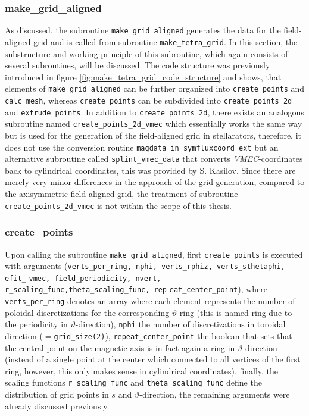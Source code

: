 \documentclass[./main.tex]{subfiles}
\begin{document}
\subsubsection{make\_grid\_aligned}
As discussed, the subroutine \texttt{make\_grid\_aligned} generates the data for the field-aligned grid and is called from subroutine \texttt{make\_tetra\_grid}. In this section, the substructure and working principle of this subroutine, which again consists of several subroutines, will be discussed. The code structure was previously introduced in figure \ref{fig:make_tetra_grid_code_structure} and shows, that elements of \texttt{make\_grid\_aligned} can be further organized into \texttt{create\_points} and \texttt{calc\_mesh}, whereas \texttt{create\_points} can be subdivided into \texttt{create\_points\_2d} and \texttt{extrude\_points}. In addition to \texttt{create\_points\_2d}, there exists an analogous subroutine named \texttt{create\_points\_2d\_vmec} which essentially works the same way but is used for the generation of the field-aligned grid in stellarators, therefore, it does not use the conversion routine \texttt{magdata\_in\_symfluxcoord\_ext} but an alternative subroutine called \texttt{splint\_vmec\_data} that converts \textit{VMEC}-coordinates back to cylindrical coordinates, this was provided by S. Kasilov. Since there are merely very minor differences in the approach of the grid generation, compared to the axisymmetric field-aligned grid, the treatment of subroutine \texttt{create\_points\_2d\_vmec} is not within the scope of this thesis.
\subsubsection{create\_points}
Upon calling the subroutine \texttt{make\_grid\_aligned}, first \texttt{create\_points} is executed with arguments (\texttt{verts\_per\_ring, nphi, verts\_rphiz, verts\_sthetaphi, efit\_}
\texttt{vmec, field\_periodicity, nvert, r\_scaling\_func,theta\_scaling\_func, rep}\newline
\texttt{eat\_center\_point}), where \texttt{verts\_per\_ring} denotes an array where each element represents the number of poloidal discretizations for the corresponding $\vartheta$-ring (this is named ring due to the periodicity in $\vartheta$-direction), \texttt{nphi} the number of discretizations in toroidal direction ($=$\texttt{grid\_size(2)}), \texttt{repeat\_center\_point} the boolean that sets that the central point on the magnetic axis is in fact again a ring in $\vartheta$-direction (instead of a single point at the center which connected to all vertices of the first ring, however, this only makes sense in cylindrical coordinates), finally, the scaling functions \texttt{r\_scaling\_func} and \texttt{theta\_scaling\_func} define the distribution of grid points in $s$ and $\vartheta$-direction, the remaining arguments were already discussed previously. \\
\end{document}
